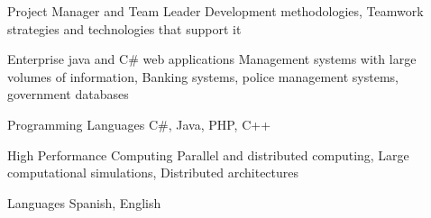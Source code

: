 


\begin{cvskills}


\cvskill
{Project Manager and Team Leader} %
{Development methodologies, Teamwork strategies and technologies that support it} %


\cvskill
{Enterprise java and C# web applications} %
{Management systems with large volumes of information, Banking systems, police management systems, government databases} %


\cvskill
{Programming Languages} %
{C#, Java, PHP, C++} %


\cvskill
{High Performance Computing} %
{Parallel and distributed computing, Large computational simulations, Distributed architectures} %


\cvskill
{Languages} %
{Spanish, English} %




\end{cvskills}

